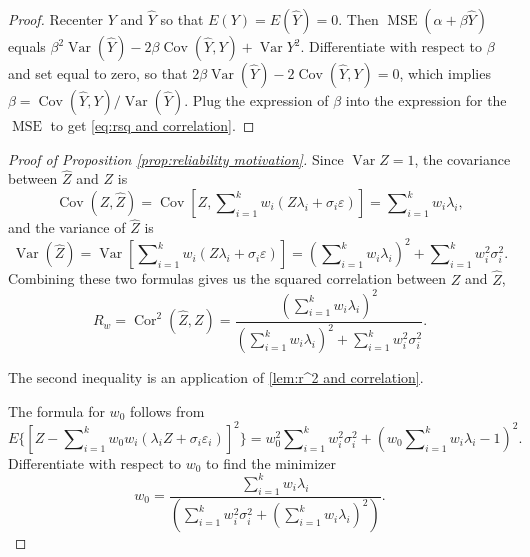 \documentclass[twoside]{article}
\DeclareMathOperator{\Var}{Var}
\DeclareMathOperator{\Cor}{Cor}
\DeclareMathOperator{\Cov}{Cov}
\DeclareMathOperator{\MSE}{MSE}
\DeclareMathOperator{\tsum}{\textstyle \sum}
\begin{document}
\begin{proof}
Recenter $Y$ and $\hat{Y}$ so that $E(Y)=E(\hat{Y})=0$. Then $\MSE(\alpha+\beta\hat{Y})$ equals $\beta^{2}\Var(\hat{Y})-2\beta\Cov(\hat{Y},Y)+\Var Y^{2}$.
Differentiate with respect to $\beta$ and set equal to zero, so that
$2\beta\Var(\hat{Y})-2\Cov(\hat{Y},Y)=0$, which implies $\beta=\Cov(\hat{Y},Y)/\Var(\hat{Y})$. Plug the expression of $\beta$ into the expression for the $\MSE$ to get \cref{eq:rsq and correlation}.
\end{proof}

\begin{proof}[Proof of Proposition \ref{prop:reliability motivation}]\label{proof:reliability motivation}
Since $\Var Z=1$, the covariance between $\hat{Z}$ and $Z$
is
\begin{equation}
\Cov(Z,\hat{Z})=\Cov[Z,{\textstyle\tsum_{i=1}^{k}w_{i}}(Z\lambda_{i}+\sigma_{i}\varepsilon)]  =  {\textstyle\tsum_{i=1}^{k}w_{i}}\lambda_{i},
\end{equation}
and the variance of $\hat{Z}$ is
\[
\Var(\hat{Z})=\Var[{\textstyle\tsum_{i=1}^{k}}w_{i}(Z\lambda_{i}+\sigma_{i}\varepsilon)]
=({\textstyle\tsum_{i=1}^{k}}w_{i}\lambda_{i})^{2}+\tsum_{i=1}^{k}w_{i}^{2}\sigma_{i}^{2}.
\]
Combining these two formulas gives us the squared correlation between
$Z$ and $\hat{Z}$,
\begin{equation}
 R_w=\Cor^{2}(\hat{Z},Z) = \frac{(\tsum_{i=1}^{k}w_{i}\lambda_{i})^{2}}{(\tsum_{i=1}^{k}w_{i}\lambda_{i})^{2}+\tsum_{i=1}^{k}w_{i}^{2}\sigma_{i}^{2}}.
\end{equation}

The second inequality is an application of \cref{lem:r^2 and correlation}.

The formula for $w_0$ follows from
\begin{equation*}
E\{[Z-\tsum_{i=1}^{k}w_{0}w_{i}(\lambda_{i}Z+\sigma_{i}\varepsilon_{i})]^{2}\} = w_{0}^{2}\tsum_{i=1}^{k}w_{i}^{2}\sigma_{i}^{2}+(w_{0}\tsum_{i=1}^{k}w_{i}\lambda_{i}-1)^{2}.
\end{equation*}
Differentiate with respect to $w_{0}$ to find the minimizer
\[
w_{0}=\frac{\tsum_{i=1}^{k}w_{i}\lambda_{i}}{(\tsum_{i=1}^{k}w_{i}^{2}\sigma_{i}^{2}+(\tsum_{i=1}^{k}w_{i}\lambda_{i})^{2})}.
\]
\end{proof}
\end{document}
